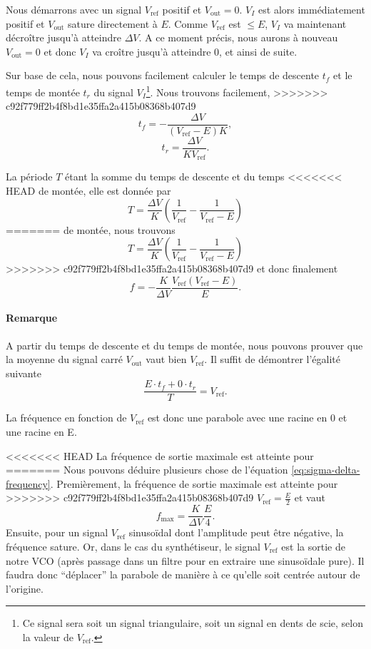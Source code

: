 Nous démarrons avec un signal $V_{\text{ref}}$ positif et
$V_{\text{out}} = 0$. $V_I$ est alors immédiatement positif
et $V_{\text{out}}$ sature directement à $E$. Comme $V_{\text{ref}}$
est $\leq E$, $V_I$ va maintenant décroître jusqu'à atteindre
$\Delta V$. A ce moment précis, nous aurons à nouveau $V_{\text{out}} = 0$
et donc $V_I$ va croître jusqu'à atteindre 0, et ainsi de suite.

Sur base de cela, nous pouvons facilement calculer
le temps de descente $t_f$ et le temps de montée $t_r$
du signal $V_I$\footnote{Ce signal sera soit un signal triangulaire,
soit un signal en dents de scie, selon la valeur de $V_{\text{ref}}$.}.
Nous trouvons facilement,
>>>>>>> c92f779ff2b4f8bd1e35ffa2a415b08368b407d9
\[ t_f = -\frac{\Delta V}{(V_{\text{ref}} - E)K},\]
\[ t_r = \frac{\Delta V}{KV_{\text{ref}}}.\]

La période $T$ étant la somme du temps de descente et du temps
<<<<<<< HEAD
de montée, elle est donnée par
\[ T = \frac{\Delta V}{K}\left(\frac{1}{V_{\text{ref}}} - \frac{1}{V_{\text{ref}} - E}\right) \]
=======
de montée, nous trouvons
\[ T = \frac{\Delta V}{K}\left(\frac{1}{V_{\text{ref}}} - \frac{1}{V_{\text{ref}} - E}\right)\]
>>>>>>> c92f779ff2b4f8bd1e35ffa2a415b08368b407d9
et donc finalement
\begin{equation} 
	f = -\frac{K}{\Delta V} \frac{V_{\text{ref}}(V_{\text{ref}}-E)}{E}.
	\label{eq:sigma-delta-frequency}
\end{equation}

\paragraph{Remarque}
A partir du temps de descente et du temps de montée, nous
pouvons prouver que la moyenne du signal carré $V_{\text{out}}$
vaut bien $V_{\text{ref}}$. Il suffit de démontrer l'égalité
suivante
\[ \frac{E \cdot t_f + 0 \cdot t_r}{T} = V_{\text{ref}}.\]

La fréquence en fonction de $V_{\text{ref}}$ est donc
une parabole avec une racine en \unit{0}{\volt} et une
racine en \unit{E}{\volt}.

<<<<<<< HEAD
La fréquence de sortie maximale est atteinte pour 
=======
Nous pouvons déduire plusieurs chose de l'équation \ref{eq:sigma-delta-frequency}. 
Premièrement, la fréquence de sortie maximale est atteinte pour 
>>>>>>> c92f779ff2b4f8bd1e35ffa2a415b08368b407d9
$V_{\text{ref}} = \frac{E}{2}$ et vaut
\[ f_{\text{max}} = \frac{K}{\Delta V}\frac{E}{4}. \]
Ensuite, pour un signal $V_{\text{ref}}$ sinusoïdal dont
l'amplitude peut être négative, la fréquence sature.
Or, dans le cas du synthétiseur, le signal $V_{\text{ref}}$
est la sortie de notre VCO (après passage dans un filtre pour
en extraire une sinusoïdale pure).
Il faudra donc ``déplacer'' la parabole de manière à ce qu'elle soit
centrée autour de l'origine.

